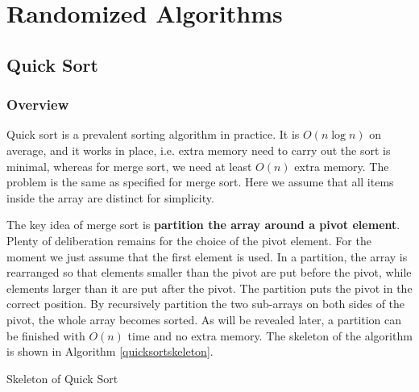 \ifx\PREAMBLE\undefined


\fi
\chapter{Randomized Algorithms}
\section{Quick Sort}
\subsection{Overview}
Quick sort is a prevalent sorting algorithm in practice. It is $O(n\log n)$ on average, and it works in place, i.e. extra memory need to carry out the sort is minimal, whereas for merge sort, we need at least $O(n)$ extra memory. The problem is the same as specified for merge sort. Here we assume that all items inside the array are distinct for simplicity. 

The key idea of merge sort is \textbf{partition the array around a pivot element}. Plenty of deliberation remains for the choice of the pivot element. For the moment we just assume that the first element is used. In a partition, the array is rearranged so that elements smaller than the pivot are put before the pivot, while elements larger than it are put after the pivot. The partition puts the pivot in the correct position. By recursively partition the two sub-arrays on both sides of the pivot, the whole array becomes sorted. As will be revealed later, a partition can be finished with $O(n)$ time and no extra memory. The skeleton of the algorithm is shown in Algorithm \ref{quicksortskeleton}.
\begin{algorithm}[ht]
\caption{Skeleton of Quick Sort}\label{quicksortskeleton}
\begin{algorithmic}[1]
\Input{}
\Output{}
\Else
{}
\EndIf
\end{algorithmic}
\end{algorithm}

